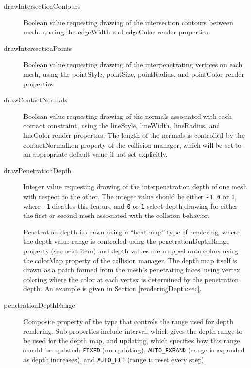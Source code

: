\begin{description}

\item[drawIntersectionContours]\mbox{}

Boolean value requesting drawing of the intersection contours between
meshes, using the {\sf edgeWidth} and {\sf edgeColor} render
properties.

\item[drawIntersectionPoints]\mbox{}

Boolean value requesting drawing of the interpenetrating vertices on
each mesh, using the {\sf pointStyle}, {\sf pointSize}, {\sf
pointRadius}, and {\sf pointColor} render properties.

\item[drawContactNormals]\mbox{}

Boolean value requesting drawing of the normals associated with each
contact constraint, using the {\sf lineStyle}, {\sf lineWidth}, {\sf
lineRadius}, and {\sf lineColor} render properties. The length of the
normals is controlled by the {\sf contactNormalLen} property of the
collision manager, which will be set to an appropriate default value
if not set explicitly.

\item[drawPenetrationDepth]\mbox{}

Integer value requesting drawing of the interpenetration depth of one
mesh with respect to the other.  The integer value should be either
{\tt -1}, {\tt 0} or {\tt 1}, where {\tt -1} disables this feature and
{\tt 0} or {\tt 1} select depth drawing for either the first or second
mesh associated with the collision behavior. 

Penetration depth is drawn using a ``heat map'' type of rendering,
where the depth value range is controlled using the {\sf
penetrationDepthRange} property (see next item) and depth values are
mapped onto colors using the {\sf colorMap} property of the collision
manager. The depth map itself is drawn as a patch formed from the
mesh's penetrating faces, using vertex coloring where the color at
each vertex is determined by the penetration depth.  An example is
given in Section \ref{renderingDepth:sec}.

\item[penetrationDepthRange]\mbox{}

Composite property of the type
 that controls the range
used for depth rendering. Sub properties include {\sf interval}, which
gives the depth range to be used for the depth map, and {\sf updating},
which specifies how this range should be updated: {\tt FIXED} (no
updating), {\tt AUTO\_EXPAND} (range is expanded as depth increases),
and {\tt AUTO\_FIT} (range is reset every step).

\end{description}

